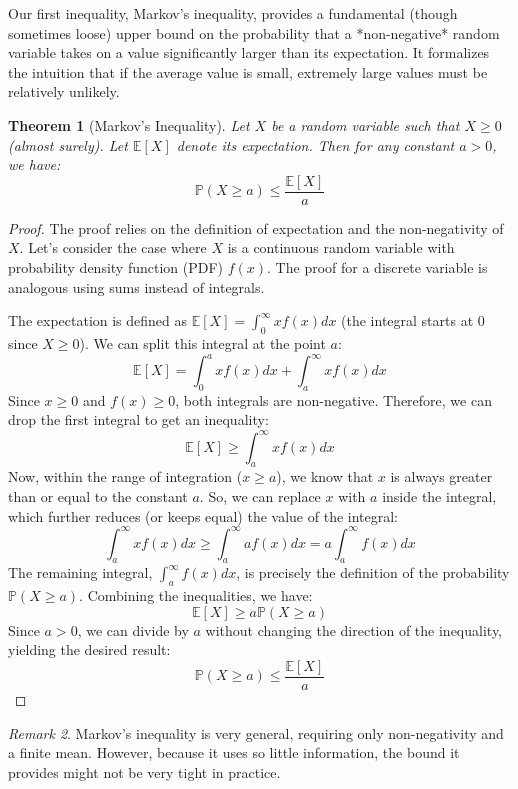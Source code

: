 \documentclass[11pt, letterpaper]{article}
\theoremstyle{plain} %
\newtheorem{theorem}{Theorem}[section]
\theoremstyle{definition} %
\theoremstyle{remark} %
\newtheorem{remark}[theorem]{Remark}
\newcommand{\E}{\mathbb{E}} %
\newcommand{\Prob}{\mathbb{P}} %
\begin{document}
Our first inequality, Markov's inequality, provides a fundamental (though sometimes loose) upper bound on the probability that a *non-negative* random variable takes on a value significantly larger than its expectation. It formalizes the intuition that if the average value is small, extremely large values must be relatively unlikely.

\begin{theorem}[Markov's Inequality] \label{thm:markov}
Let $X$ be a random variable such that $X \ge 0$ (almost surely). Let $\E[X]$ denote its expectation. Then for any constant $a > 0$, we have:
\[
\Prob(X \ge a) \le \frac{\E[X]}{a}
\]
\end{theorem}

\begin{proof}
The proof relies on the definition of expectation and the non-negativity of $X$. Let's consider the case where $X$ is a continuous random variable with probability density function (PDF) $f(x)$. The proof for a discrete variable is analogous using sums instead of integrals.

The expectation is defined as $\E[X] = \int_{0}^{\infty} x f(x) dx$ (the integral starts at 0 since $X \ge 0$). We can split this integral at the point $a$:
\[
\E[X] = \int_{0}^{a} x f(x) dx + \int_{a}^{\infty} x f(x) dx
\]
Since $x \ge 0$ and $f(x) \ge 0$, both integrals are non-negative. Therefore, we can drop the first integral to get an inequality:
\[
\E[X] \ge \int_{a}^{\infty} x f(x) dx
\]
Now, within the range of integration ($x \ge a$), we know that $x$ is always greater than or equal to the constant $a$. So, we can replace $x$ with $a$ inside the integral, which further reduces (or keeps equal) the value of the integral:
\[
\int_{a}^{\infty} x f(x) dx \ge \int_{a}^{\infty} a f(x) dx = a \int_{a}^{\infty} f(x) dx
\]
The remaining integral, $\int_{a}^{\infty} f(x) dx$, is precisely the definition of the probability $\Prob(X \ge a)$.
Combining the inequalities, we have:
\[
\E[X] \ge a \Prob(X \ge a)
\]
Since $a > 0$, we can divide by $a$ without changing the direction of the inequality, yielding the desired result:
\[
\Prob(X \ge a) \le \frac{\E[X]}{a}
\]
\end{proof}

\begin{remark}
Markov's inequality is very general, requiring only non-negativity and a finite mean. However, because it uses so little information, the bound it provides might not be very tight in practice.
\end{remark}
\end{document}
